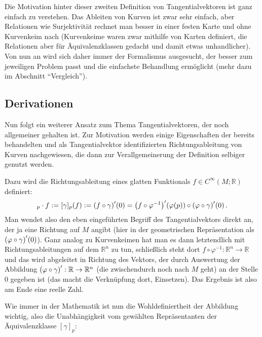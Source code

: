 \documentclass[../H_Analysis_main.tex]{subfiles}
\begin{document}
Die Motivation hinter dieser zweiten Definition von Tangentialvektoren ist ganz einfach zu verstehen. Das Ableiten von Kurven ist zwar sehr einfach, aber Relationen wie Surjektivität rechnet man besser in einer festen Karte und ohne Kurvenkeim nach (Kurvenkeime waren zwar mithilfe von Karten definiert, die Relationen aber für Äquivalenzklassen gedacht und damit etwas unhandlicher). Von nun an wird sich daher immer der Formalismus ausgesucht, der besser zum jeweiligen Problem passt und die einfachste Behandlung ermöglicht (mehr dazu im Abschnitt \enquote{Vergleich}).



		\subsection{Derivationen}
Nun folgt ein weiterer Ansatz zum Thema Tangentialvektoren, der noch allgemeiner gehalten ist. Zur Motivation werden einige Eigenschaften der bereits behandelten und als Tangentialvektor identifizierten Richtungsableitung von Kurven nachgewiesen, die dann zur Verallgemeinerung der Definition selbiger genutzt werden.

Dazu wird die Richtungsableitung eines glatten Funktionals $f \in C^\infty(M; \mathbb{R})$ definiert:
\begin{equation}
[\gamma]_p \cdot f := [\gamma]_p(f) := \qty(f \circ \gamma)'(0) = \qty(f \circ \varphi^{-1})'\qty(\varphi(p)) \circ \qty(\varphi \circ \gamma)'(0) \, .
\end{equation}
Man wendet also den eben eingeführten Begriff des Tangentialvektors direkt an, der ja eine Richtung auf $M$ angibt (hier in der geometrischen Repräsentation als $\qty(\varphi \circ \gamma)'(0)$). Ganz analog zu Kurvenkeimen hat man es dann letztendlich mit Richtungsableitungen auf dem $\mathbb{R}^n$ zu tun, schließlich steht dort $f \circ \varphi^{-1}: \mathbb{R}^n \rightarrow \mathbb{R}$ und das wird abgeleitet in Richtung des Vektors, der durch Auswertung der Abbildung $\qty(\varphi \circ \gamma)': \mathbb{R} \rightarrow \mathbb{R}^n$ (die zwischendurch noch nach $M$ geht) an der Stelle 0 gegeben ist (das macht die Verknüpfung dort, Einsetzen). Das Ergebnis ist also am Ende eine reelle Zahl.


Wie immer in der Mathematik ist nun die Wohldefiniertheit der Abbildung wichtig, also die Unabhängigkeit vom gewählten Repräsentanten der Äquivalenzklasse $[\gamma]_p$:
\end{document}
